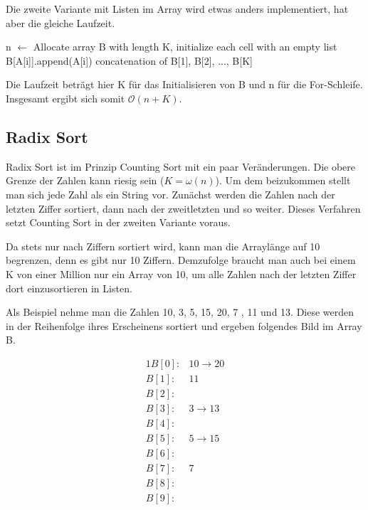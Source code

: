 \documentclass[10pt,a4paper,oneside,ngerman,numbers=noenddot]{scrartcl}
\begin{document}
		Die zweite Variante mit Listen im Array wird etwas anders implementiert, hat aber die gleiche Laufzeit.
		
		\begin{algorithmic}[1]
				\State n $\gets$ 
				\State Allocate array B with length K, initialize each cell with an empty list
					\State B[A[i]].append(A[i])
				\EndFor
				\State \Return concatenation of B[1], B[2], ..., B[K]
			\EndFunction
		\end{algorithmic}
		
		Die Laufzeit beträgt hier K für das Initialisieren von B und n für die For-Schleife. Insgesamt ergibt sich somit $\mathcal{O}(n + K)$.
		
	\subsection{Radix Sort}
	
		Radix Sort ist im Prinzip Counting Sort mit ein paar Veränderungen. Die obere Grenze der Zahlen kann riesig sein ($K = \omega(n)$). Um dem beizukommen stellt man sich jede Zahl als ein String vor. Zunächst werden die Zahlen nach der letzten Ziffer sortiert, dann nach der zweitletzten und so weiter. Dieses Verfahren setzt Counting Sort in der zweiten Variante voraus.
		
		Da stets nur nach Ziffern sortiert wird, kann man die Arraylänge auf 10 begrenzen, denn es gibt nur 10 Ziffern. Demzufolge braucht man auch bei einem K von einer Million nur ein Array von 10, um alle Zahlen nach der letzten Ziffer dort einzusortieren in Listen.
		
		Als Beispiel nehme man die Zahlen 10, 3, 5, 15, 20, 7 , 11 und 13. Diese werden in der Reihenfolge ihres Erscheinens sortiert und ergeben folgendes Bild im Array B.
		
		\begin{alignat*}{1}
			B[0]:& 10 \rightarrow 20 \\
			B[1]:& 11 \\
			B[2]:& \\
			B[3]:& 3 \rightarrow 13 \\
			B[4]:& \\
			B[5]:& 5 \rightarrow 15 \\
			B[6]:& \\
			B[7]:& 7 \\
			B[8]:& \\
			B[9]:&
		\end{alignat*}
		
\end{document}

